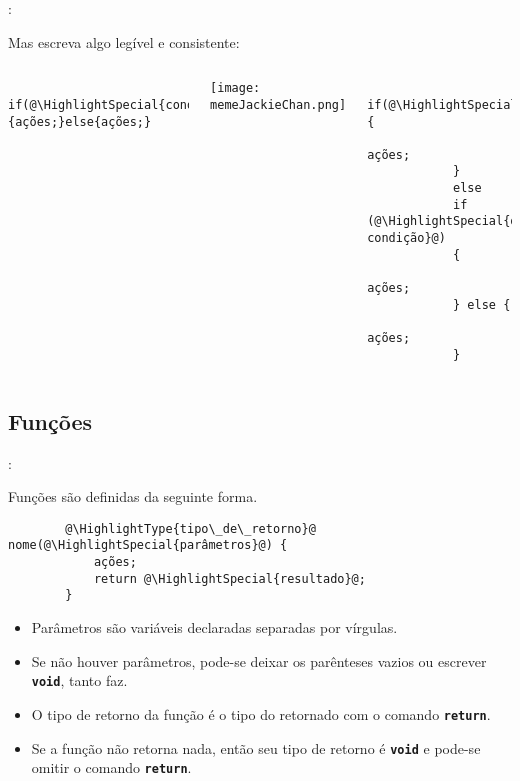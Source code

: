 \begin{frame}[fragile]{\insertsection: \insertsubsection}

	Mas escreva algo legível e consistente:
	\begin{columns}[t]
		\begin{verbatim}
			if(@\HighlightSpecial{condição}@){ações;}else{ações;}
		\end{verbatim}
		\texttt{[image: memeJackieChan.png]}

		\begin{verbatim}
			if(@\HighlightSpecial{condição}@) {
				ações;
			}
			else
			if (@\HighlightSpecial{outra condição}@)
			{
				ações;
			} else {
				ações;
			}
		\end{verbatim}
	\end{columns}

\end{frame}


\subsection{Funções}


\begin{frame}[fragile]{\insertsection: \insertsubsection}

	Funções são definidas da seguinte forma.
	\begin{verbatim}
		@\HighlightType{tipo\_de\_retorno}@ nome(@\HighlightSpecial{parâmetros}@) {
			ações;
			return @\HighlightSpecial{resultado}@;
		}
	\end{verbatim}

	\begin{itemize}
		\item Parâmetros são variáveis declaradas separadas por vírgulas.
		\item Se não houver parâmetros, pode-se deixar os parênteses vazios ou escrever \texttt{\textbf{void}}, tanto faz.
		\item O tipo de retorno da função é o tipo do  retornado com o comando \texttt{\textbf{return}}.
		\item Se a função não retorna nada, então seu tipo de retorno é \texttt{\textbf{void}} e pode-se omitir o comando \texttt{\textbf{return}}.
	\end{itemize}

\end{frame}


